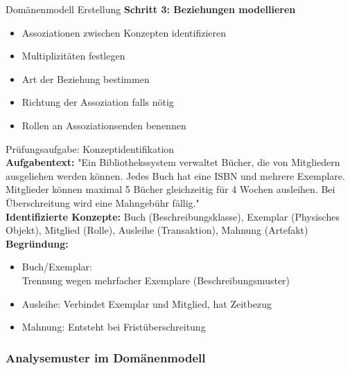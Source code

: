 \begin{KR}{Domänenmodell Erstellung}
\textbf{Schritt 3: Beziehungen modellieren}
\begin{itemize}
    \item Assoziationen zwischen Konzepten identifizieren
    \item Multiplizitäten festlegen
    \item Art der Beziehung bestimmen
    \item Richtung der Assoziation falls nötig
    \item Rollen an Assoziationsenden benennen
\end{itemize}
\end{KR}





\begin{example2}{Prüfungsaufgabe: Konzeptidentifikation}\\
    \small
\textbf{Aufgabentext:} 
"Ein Bibliothekssystem verwaltet Bücher, die von Mitgliedern ausgeliehen werden können. Jedes Buch hat eine ISBN und mehrere Exemplare. Mitglieder können maximal 5 Bücher gleichzeitig für 4 Wochen ausleihen. Bei Überschreitung wird eine Mahngebühr fällig."
\vspace{2mm}\\
\textbf{Identifizierte Konzepte:}
Buch (Beschreibungsklasse), Exemplar (Physisches Objekt), Mitglied (Rolle), Ausleihe (Transaktion), Mahnung (Artefakt)
\vspace{2mm}\\
\textbf{Begründung:}
\begin{itemize}
    \item Buch/Exemplar: \\ Trennung wegen mehrfacher Exemplare (Beschreibungsmuster)
    \item Ausleihe: Verbindet Exemplar und Mitglied, hat Zeitbezug
    \item Mahnung: Entsteht bei Fristüberschreitung
\end{itemize}
\end{example2}


\subsubsection{Analysemuster im Domänenmodell}

